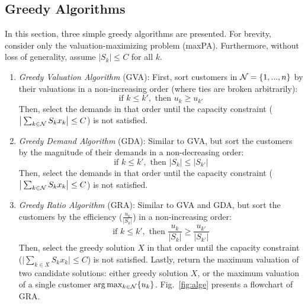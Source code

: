 
\vspace{-5pt}
\subsection{Greedy Algorithms}

In this section, three simple greedy algorithms are presented. For brevity, consider only the valuation-maximizing problem ({\sc maxPA}). Furthermore, without loss of generality, assume $|S_k| \le C$ for all $k$. 

\begin{enumerate}

\item
{\em Greedy Valuation Algorithm} {\sc(GVA)}: First, sort customers in $\mathcal N = \{1,...,n\}$ by their valuations in a non-increasing order (where ties are broken arbitrarily): \vspace{-5pt}
\begin{equation}
\mbox{if\ }  k \le k', \mbox{\ then\ }  
u_{k} \ge u_{k'}
\end{equation}
Then, select the demands in that order until the capacity constraint ($\big|\sum_{k\in {\cal N}}S_k x_k\big| \le C$) is not satisfied. 


\item 
{\em Greedy Demand Algorithm} {\sc(GDA)}: Similar to {\sc GVA}, but sort the customers by the magnitude of their demands in a non-decreasing order:  \vspace{-5pt}
\begin{equation}
\mbox{if\ }  k \le k', \mbox{\ then\ }  
|S_{k}| \le |S_{k'}|
\end{equation}
Then, select the demands in that order until the capacity constraint ($\big|\sum_{k\in {\cal N}}S_k x_k\big| \le C$) is not satisfied. 

\item 
{\em Greedy Ratio Algorithm} {\sc (GRA)}: Similar to {\sc GVA} and {\sc GDA}, but sort the customers by the efficiency ($\frac{u_k}{|S_k|}$) in a non-increasing order:  %
\begin{equation}
\mbox{if\ }  k \le k', \mbox{\ then\ }  
\frac{u_k}{|S_k|} \ge \frac{u_{k'}}{|S_{k'}|} 
\end{equation}
Then, select the greedy solution $X$ in that order until the capacity constraint ($\big|\sum_{k\in X}S_k x_k\big| \le C$) is not satisfied. Lastly, return the maximum valuation of two candidate solutions: either greedy solution $X$, or the maximum valuation of a single customer $\arg\max_{k\in \mathcal N}\{ u_k\}$. Fig.~\ref{fig:alge} presents a flowchart of {\sc GRA}.
\end{enumerate}


